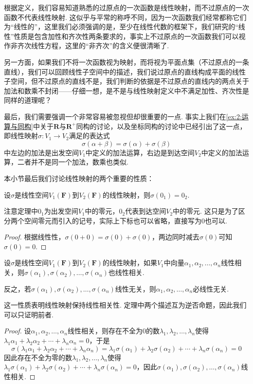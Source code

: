 根据定义，我们容易知道熟悉的过原点的一次函数是线性映射，而不过原点的一次函数不代表线性映射. 这似乎与平常的称呼不同，因为一次函数我们经常都称它们为``线性的''，这里我们必须强调的是，至少在线性代数的框架下，我们研究的``线性''性质是包含加性和齐次性两条要求的，事实上不过原点的一次函数我们可以视作非齐次线性方程，这里的``非齐次''的含义便很清晰了.

另一方面，如果我们不将一次函数视为映射，而将视为平面点集（不过原点的一条直线），我们可以回顾线性子空间中的描述，我们说过原点的直线构成平面的线性子空间，但不过原点的直线不是，我们判断的依据是不过原点的直线内的两点关于加法和数乘不封闭——仔细一想，是不是与线性映射定义中不满足加性、齐次性是同样的道理呢？

最后，我们需要强调一个非常容易被忽视但却很重要的一点. 事实上我们在\autoref{ex:2:运算与同构}中关于$\mathbf{R}$与$\mathbf{R}^+$同构的讨论，以及坐标同构的讨论中已经引出了这一点，即线性映射$\sigma:V_1\to V_2$满足的表达式
\[\sigma(\alpha+\beta)=\sigma(\alpha)+\sigma(\beta)\]
中左边的加法是出发空间$V_1$中定义的加法运算，右边是到达空间$V_2$中定义的加法运算，二者并不是同一个加法，数乘也类似. %

本小节最后我们讨论线性映射的两个重要的性质：
\begin{theorem}\label{thm:5:线性映射零元性质}
    设$\sigma$是线性空间$V_1(\mathbf{F})$到$V_2(\mathbf{F})$的线性映射，则$\sigma(0_1)=0_2$.
\end{theorem}
注意定理中$0_1$为出发空间$V_1$中的零元，$0_2$代表到达空间$V_2$中的零元. 这只是为了区分两个空间零元而引入的记号，实际上下标也可以省略，直接写为0也可以.

\begin{proof}
    根据线性性，$\sigma(0+0)=\sigma(0)+\sigma(0)$，两边同时减去$\sigma(0)$可知$\sigma(0)=0$.
\end{proof}

\begin{theorem}\label{thm:5:线性映射保相关性}
    设$\sigma$是线性空间$V_1(\mathbf{F})$到$V_2(\mathbf{F})$的线性映射，如果$V_1$中向量$\alpha_1,\alpha_2,\ldots,\alpha_n$线性相关，则$\sigma(\alpha_1),\sigma(\alpha_2),\ldots,\sigma(\alpha_n)$也线性相关.

    反之，若$\sigma(\alpha_1),\sigma(\alpha_2),\ldots,\sigma(\alpha_n)$线性无关，则$\alpha_1,\alpha_2,\ldots,\alpha_n$必线性无关.
\end{theorem}
这一性质表明线性映射保持线性相关性. 定理中两个描述互为逆否命题，因此我们可以只证明前者.

\begin{proof}
    设$\alpha_1,\alpha_2,\ldots,\alpha_n$线性相关，则存在不全为0的数$\lambda_1,\lambda_2,\ldots,\lambda_n$使得$\lambda_1\alpha_1+\lambda_2\alpha_2+\cdots+\lambda_n\alpha_n=0$，于是
    \[\sigma(\lambda_1\alpha_1+\lambda_2\alpha_2+\cdots+\lambda_n\alpha_n)=\lambda_1\sigma(\alpha_1)+\lambda_2\sigma(\alpha_2)+\cdots+\lambda_n\sigma(\alpha_n)=0\]
    因此存在不全为零的数$\lambda_1,\lambda_2,\ldots,\lambda_n$使得$\lambda_1\sigma(\alpha_1)+\lambda_2\sigma(\alpha_2)+\cdots+\lambda_n\sigma(\alpha_n)=0$，因此$\sigma(\alpha_1),\sigma(\alpha_2),\ldots,\sigma(\alpha_n)$线性相关.
\end{proof}

